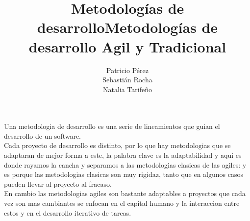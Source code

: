 \documentclass[a4paper,11pt]{report}
\begin{document}
\title{Metodologías de desarrollo}
\author{Patricio Pérez\\
        Sebastián Rocha\\
        Natalia Tarifeño}
\maketitle

\title {Metodologías de desarrollo Agil y Tradicional}

Una metodologia de desarrollo es una serie de lineamientos que guian el desarrollo de un software.\\
Cada proyecto de desarrollo es distinto, por lo que hay metodologias que se adaptaran de mejor forma a este, la palabra clave es la adaptabilidad y aqui es donde rayamos la cancha y separamos a las metodologias clasicas de las agiles: y es porque las metodologias clasicas son muy rigidaz, tanto que en algunos casos pueden llevar al proyecto al fracaso.\\
En cambio las metodologias agiles son bastante adaptables a proyectos que cada vez son mas cambiantes se enfocan en el capital humano y la interaccion entre estos y en el desarrollo iterativo de tareas.
\end{document}
